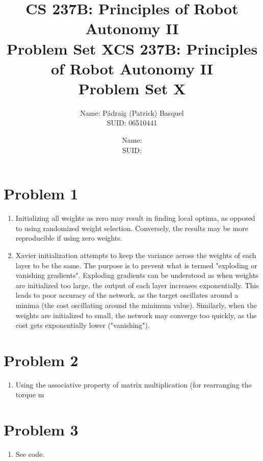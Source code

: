 \documentclass{article}
\title{CS 237B: Principles of Robot Autonomy II \\ Problem Set X}
\author{Name: Pádraig (Patrick) Basquel      \\ SUID: 06510441}
\date{}
\title{CS 237B: Principles of Robot Autonomy II \\ Problem Set X}
\author{Name:      \\ SUID:}
\date{}
\begin{document}
\maketitle
\pagestyle{fancy} 


\section*{Problem 1}
\begin{enumerate}[label=(\roman*)]
\item Initializing all weights as zero may result in finding local optima, as opposed to using randomized weight selection. Conversely, the results may be more reproducible if using zero weights.
\item Xavier initialization attempts to keep the variance across the weights of each layer to be the same. The purpose is to prevent what is termed "exploding or vanishing gradients". Exploding gradients can be understood as when weights are initialized too large, the output of each layer increases exponentially. This leads to poor accuracy of the network, as the target oscillates around a minima (the cost oscillating around the minimum value). Similarly, when the weights are initialized to small, the network may converge too quickly, as the cost gets exponentially lower ("vanishing").

\end{enumerate}


\section*{Problem 2}
\begin{enumerate}[label=(\roman*)]
\item Using the associative property of matrix multiplication (for rearranging the torque m

\end{enumerate}


\section*{Problem 3}
\begin{enumerate}[label=(\roman*)]
\item See code.


\end{enumerate}
\end{document}

